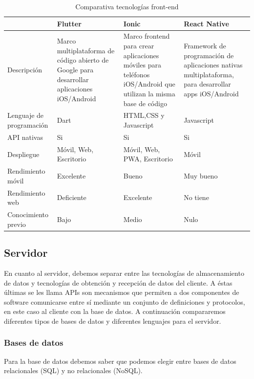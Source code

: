 \begin{table}[H] %
    \centering
    \begin{tabular}{|p{2cm} |p{4 cm} |p{4cm} |p{4cm} |} \hline 
         &  \textbf{Flutter}&  \textbf{Ionic}& \textbf{React Native}\\  \hline 
         Descripción &  Marco multiplataforma de código abierto de Google para desarrollar aplicaciones iOS/Android &  Marco frontend para crear aplicaciones móviles para teléfonos iOS/Android que utilizan la misma base de código& Framework de programación de aplicaciones nativas multiplataforma, para desarrollar apps iOS/Android\\ \hline 
         
        Lenguaje de programación &  Dart&  HTML,CSS y Javascript & Javascript\\ \hline 
        API nativas &  Si&  Si & Si\\ \hline 
        Despliegue &  Móvil, Web, Escritorio&  Móvil, Web, PWA, Escritorio & Móvil\\ \hline 
        Rendimiento móvil &  Excelente &  Bueno & Muy bueno\\ \hline 
        Rendimiento web &  Deficiente &  Excelente & No tiene\\ \hline 
        Conocimiento previo & Bajo & Medio & Nulo \\ \hline
    \end{tabular}
    \caption{Comparativa tecnologías front-end \cite{flut-ion} \cite{flut-react}}
    \label{tab:tec_front}
\end{table}

\subsection{Servidor}

En cuanto al servidor, debemos separar entre las tecnologías de almacenamiento de datos y tecnologías de obtención y recepción de datos del cliente. A éstas últimas se les llama APIs \cite{api} son mecanismos que permiten a dos componentes de software comunicarse entre sí mediante un conjunto de definiciones y protocolos, en este caso al cliente con la base de datos. A continuación compararemos diferentes tipos de bases de datos y diferentes lenguajes para el servidor.

\subsubsection{Bases de datos}
Para la base de datos debemos saber que podemos elegir entre bases de datos relacionales (SQL) y no relacionales (NoSQL).

